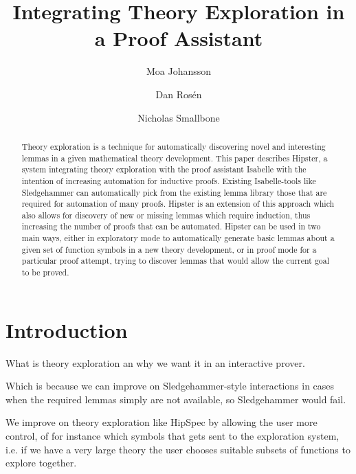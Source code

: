\documentclass{llncs}
\begin{document}
\title{Integrating Theory Exploration in a Proof Assistant}

\author{Moa Johansson \and Dan Ros\'en \and Nicholas Smallbone}


\maketitle

\begin{abstract}
Theory exploration is a technique for automatically discovering novel and interesting lemmas in a given mathematical theory development. This paper describes Hipster, a system integrating theory exploration with the proof assistant Isabelle with the intention of increasing automation for inductive proofs. 
Existing Isabelle-tools like Sledgehammer can automatically pick from the existing lemma library those that are required for automation of many proofs. Hipster is an extension of this approach which also allows for discovery of new or missing lemmas which require induction, thus increasing the number of proofs that can be automated.
Hipster can be used in two main ways, either in exploratory mode to automatically generate basic lemmas about a given set of function symbols in a new theory development, or in proof mode for a particular proof attempt, trying to discover lemmas that would allow the current goal to be proved. 

\end{abstract}

\section{Introduction}
%

What is theory exploration an why we want it in an interactive prover. 

Which is because we can improve on Sledgehammer-style interactions in cases when the required lemmas simply are not available, so Sledgehammer would fail. 

We improve on theory exploration like HipSpec by allowing the user more control, of for instance which symbols that gets sent to the exploration system, i.e. if we have a very large theory the user chooses suitable subsets of functions to explore together.
\end{document}

